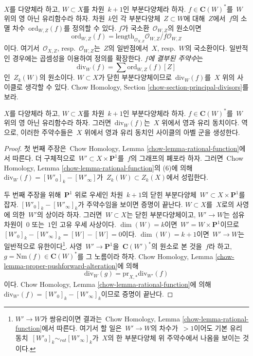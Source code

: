 \noindent
$X$를 다양체라 하고, $W \subset X$를 차원\  $k + 1$인 부분다양체라 하자.
$f \in \mathbf{C}(W)^*$를\  $W$ 위의 영 아닌 유리함수라 하자.
차원\  $k$인 각 부분다양체\  $Z \subset W$에 대해\  $Z$에서\  $f$의 소멸 차수\ 
$\text{ord}_{W, Z}(f)$를 정의할 수 있다.
$f$가 국소환\  $\mathcal{O}_{W, Z}$의 원소이면
$$
\text{ord}_{W, Z}(f) =
\text{length}_{\mathcal{O}_{X, Z}} \mathcal{O}_{W, Z}/f\mathcal{O}_{W, Z}
$$
이다. 여기서\  $\mathcal{O}_{X, Z}$, resp.\ $\mathcal{O}_{W, Z}$는\ 
$Z$의 일반점에서\  $X$, resp.\ $W$의 국소환이다. 일반적인 경우에는
곱셈성을 이용하여 정의를 확장한다. {\it $f$에 결부된 주약수}는
$$
\text{div}_W(f) = \sum \text{ord}_{W, Z}(f)[Z]
$$
인\  $Z_k(W)$의 원소이다. $W \subset X$가 닫힌 부분다양체이므로\ 
$\text{div}_W(f)$를\  $X$ 위의 사이클로 생각할 수 있다.
Chow Homology, Section \ref{chow-section-principal-divisors}를 보라.

\begin{lemma}
\label{lemma-rational-equivalence}
$X$를 다양체라 하고, $W \subset X$를 차원\  $k + 1$인 부분다양체라 하자.
$f \in \mathbf{C}(W)^*$를\  $W$ 위의 영 아닌 유리함수라 하자. 그러면\ 
$\text{div}_W(f)$는\  $X$ 위에서 영과 유리 동치이다. 역으로, 이러한
주약수들은\  $X$ 위에서 영과 유리 동치인 사이클의 아벨 군을 생성한다.
\end{lemma}

\begin{proof}
첫 번째 주장은\  Chow Homology, Lemma
\ref{chow-lemma-rational-function}에서 따른다.
더 구체적으로\  $W' \subset X \times \mathbf{P}^1$를\  $f$의 그래프의
폐포라 하자. 그러면\  Chow Homology, Lemma
\ref{chow-lemma-rational-function}의 (6)에 의해\ 
$\text{div}_W(f) = [W'_0]_k - [W'_\infty]$가\ 
$Z_k(W) \subset Z_k(X)$에서 성립한다.

\medskip\noindent
두 번째 주장을 위해\  $\mathbf{P}^1$ 위로 우세인 차원\  $k + 1$의 닫힌
부분다양체\  $W' \subset X \times \mathbf{P}^1$를 잡자.
$[W'_0]_k - [W'_\infty]_k$가 주약수임을 보이면 증명이 끝난다.
$W \subset X$를\  $X$로의 사영에 의한\  $W'$의 상이라 하자.
그러면\  $W \subset X$는 닫힌 부분다양체이고, $W' \to W$는 섬유 차원이\ 
$0$ 또는\  $1$인 고유 우세 사상이다. $\dim(W) = k$이면\ 
$W' = W \times \mathbf{P}^1$이므로\ 
$[W'_0]_k - [W'_\infty]_k = [W] - [W] = 0$이다.
$\dim(W) = k + 1$이면\  $W' \to W$는 일반적으로 유한이다\footnote{
$W' \to W$가 쌍유리이면 결과는\  Chow Homology, Lemma
\ref{chow-lemma-rational-function}에서 따른다. 여기서 할 일은\ 
$W' \to W$의 차수가\  $> 1$이어도 기본 유리 동치\ 
$[W'_0]_k \sim_{rat} [W'_\infty]_k$가\  $X$의 한 부분다양체 위 주약수에서
나옴을 보이는 것이다.}. 사영\  $W' \to \mathbf{P}^1$을\ 
$\mathbf{C}(W')^*$의 원소로 본 것을\  $f$라 하고,
$g = \text{Nm}(f) \in \mathbf{C}(W)^*$를 그 노름이라 하자.
Chow Homology, Lemma
\ref{chow-lemma-proper-pushforward-alteration}에 의해
$$
\text{div}_W(g) = \text{pr}_{X, *}\text{div}_{W'}(f)
$$
이다. Chow Homology, Lemma \ref{chow-lemma-rational-function}에 의해\ 
$\text{div}_{W'}(f) = [W'_0]_k - [W'_\infty]_k$이므로 증명이 끝난다.
\end{proof}


